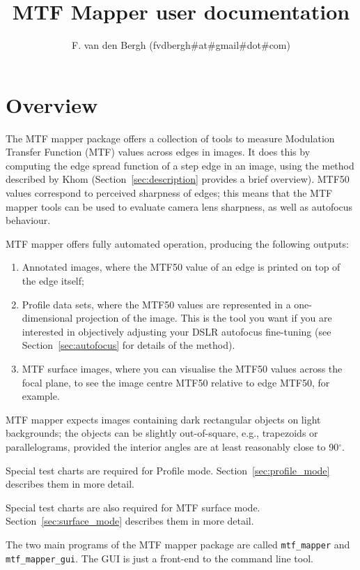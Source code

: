 \documentclass[a4paper]{article}
\title{MTF Mapper user documentation}
\author{F. van den Bergh (fvdbergh\#at\#gmail\#dot\#com)}
\begin{document}
\maketitle

\tableofcontents

\newpage

\section{Overview}
The MTF mapper package offers a collection of tools to measure Modulation
Transfer Function (MTF) values across edges in images. 
It does this by computing the edge spread function of a step edge in an
image, using the method described by Khom \cite{khom}
(Section~\ref{sec:description} provides a brief overview).
MTF50 values correspond to perceived sharpness of edges; this means that the
MTF mapper tools can be used to evaluate camera lens sharpness, as well as
autofocus behaviour.

MTF mapper offers fully automated operation, producing the following
outputs:
\begin{enumerate}
    \item Annotated images, where the MTF50 value of an edge is printed on top
of the edge itself;
    \item Profile data sets, where the MTF50 values are represented in a
one-dimensional projection of the image. This is the tool you want if you
are interested in objectively adjusting your DSLR autofocus fine-tuning (see
Section~\ref{sec:autofocus} for details of the method).
    \item MTF surface images, where you can visualise the MTF50 values
across the focal plane, to see the image centre MTF50 relative to edge MTF50,
for example.
\end{enumerate}

MTF mapper expects images containing dark rectangular objects on light
backgrounds; the objects can be slightly out-of-square, e.g., trapezoids or
parallelograms, provided the interior angles are at least reasonably close
to 90$^\circ$.

Special test charts are required for Profile mode.
Section~\ref{sec:profile_mode} describes them in more detail.

Special test charts are also required for MTF surface mode.
Section~\ref{sec:surface_mode} describes them in more detail.

The two main programs of the MTF mapper package are called \verb+mtf_mapper+
and \verb+mtf_mapper_gui+. The GUI is just a front-end to the command line
tool.
\end{document}
